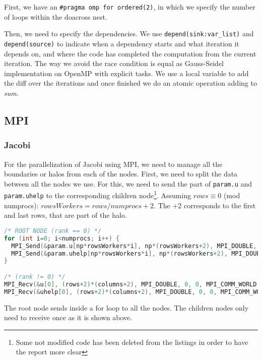 \documentclass[a4paper, 10pt]{article}
\begin{document}
First, we have an \texttt{\#pragma omp for ordered(2)}, in which we specify the number of loops within the doacross nest. 

Then, we need to specify the dependencies. We use \texttt{depend(sink:var\_list)} and \texttt{depend(source)} to indicate when a dependency starts and what iteration it depends on, and where the code has completed the computation from the current iteration. The way we avoid the race condition is equal as Gauss-Seidel implementation on OpenMP with explicit tasks. We use a local variable to add the diff over the iterations and once finished we do an atomic operation adding to \textit{sum}.


\clearpage

\subsection{MPI}

\subsubsection{Jacobi}

For the parallelization of Jacobi using MPI, we need to manage all the boundaries or halos from each of the nodes. First, we need to split the data between all the nodes we use. For this, we need to send the part of \texttt{param.u} and \texttt{param.uhelp} to the corresponding children node\footnote{Some not modified code has been deleted from the listings in order to have the report more clear}. Assuming $rows \equiv 0 $ (mod numprocs): $rowsWorkers = rows / numprocs + 2$. The +2 corresponds to the first and last rows, that are part of the halo.

\begin{lstlisting}[language=c, caption={Sending/Receiving initial data to all nodes}]
/* ROOT NODE (rank == 0) */
for (int i=0; i<numprocs; i++) {
  MPI_Send(&param.u[np*rowsWorkers*i], np*(rowsWorkers+2), MPI_DOUBLE, i, 0, MPI_COMM_WORLD);
  MPI_Send(&param.uhelp[np*rowsWorkers*i], np*(rowsWorkers+2), MPI_DOUBLE, i, 0, MPI_COMM_WORLD);
}    

/* (rank != 0) */
MPI_Recv(&u[0], (rows+2)*(columns+2), MPI_DOUBLE, 0, 0, MPI_COMM_WORLD, &status);
MPI_Recv(&uhelp[0], (rows+2)*(columns+2), MPI_DOUBLE, 0, 0, MPI_COMM_WORLD, &status);
\end{lstlisting}

The root node sends inside a for loop to all the nodes. The children nodes only need to receive once as it is shown above.
\end{document}

